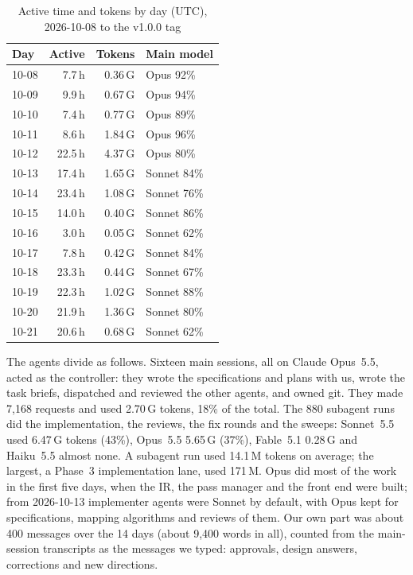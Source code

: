 \documentclass[conference]{IEEEtran}
\begin{document}
\begin{table}[t]
\caption{Active time and tokens by day (UTC), 2026-10-08 to the v1.0.0 tag}
\label{tab:days}
\centering
\footnotesize
\begin{tabular}{@{}lrrl@{}}
\toprule
Day & Active & Tokens & Main model \\
\midrule
10-08 & 7.7\,h & 0.36\,G & Opus 92\% \\
10-09 & 9.9\,h & 0.67\,G & Opus 94\% \\
10-10 & 7.4\,h & 0.77\,G & Opus 89\% \\
10-11 & 8.6\,h & 1.84\,G & Opus 96\% \\
10-12 & 22.5\,h & 4.37\,G & Opus 80\% \\
10-13 & 17.4\,h & 1.65\,G & Sonnet 84\% \\
10-14 & 23.4\,h & 1.08\,G & Sonnet 76\% \\
10-15 & 14.0\,h & 0.40\,G & Sonnet 86\% \\
10-16 & 3.0\,h & 0.05\,G & Sonnet 62\% \\
10-17 & 7.8\,h & 0.42\,G & Sonnet 84\% \\
10-18 & 23.3\,h & 0.44\,G & Sonnet 67\% \\
10-19 & 22.3\,h & 1.02\,G & Sonnet 88\% \\
10-20 & 21.9\,h & 1.36\,G & Sonnet 80\% \\
10-21 & 20.6\,h & 0.68\,G & Sonnet 62\% \\
\bottomrule
\end{tabular}
\end{table}

The agents divide as follows. Sixteen main sessions, all on Claude Opus~5.5, acted as the
controller: they wrote the specifications and plans with us, wrote the task briefs, dispatched
and reviewed the other agents, and owned git. They made 7,168 requests and used 2.70\,G tokens,
18\% of the total. The 880 subagent runs did the implementation, the reviews, the fix rounds and
the sweeps: Sonnet~5.5 used 6.47\,G tokens (43\%), Opus~5.5 5.65\,G (37\%), Fable~5.1 0.28\,G and
Haiku~5.5 almost none. A subagent run used 14.1\,M tokens on average; the largest, a Phase~3
implementation lane, used 171\,M. Opus did most of the work in the first five days, when the IR,
the pass manager and the front end were built; from 2026-10-13 implementer agents were Sonnet by
default, with Opus kept for specifications, mapping algorithms and reviews of them. Our own part
was about 400 messages over the 14 days (about 9,400 words in all), counted from the
main-session transcripts as the messages we typed: approvals, design answers, corrections and new
directions.
\end{document}
